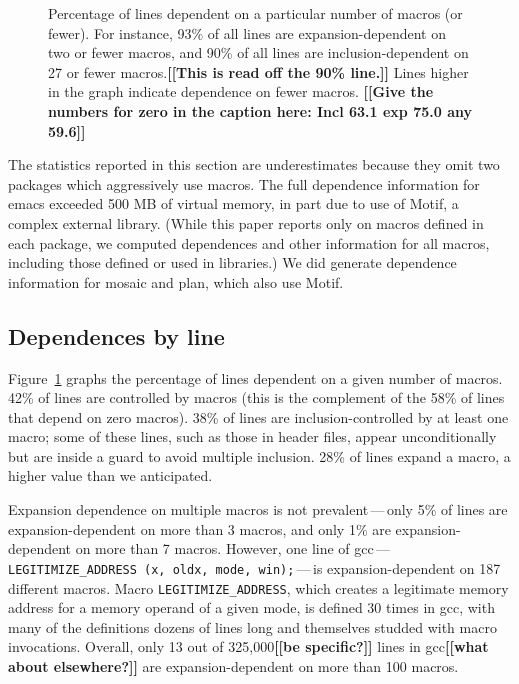 \documentclass[10pt]{article}
\newcommand{\comment}[1]{\textbf{[[#1]]}}
\newcommand{\pkg}[1]{\textsf{#1}}
\newcommand{\captionsmall}[1]{\caption[]{\small #1}}
\begin{document}
\begin{figure}
\centerline{}

\captionsmall{Percentage of lines dependent on a particular number of macros (or
  fewer).  For instance, 93\% of all lines are expansion-dependent on two
  or fewer macros, and 90\% of all lines are inclusion-dependent on 27 or
  fewer macros.\comment{This is read off the 90\% line.}  Lines higher in the graph indicate dependence on fewer macros.
  \comment{Give the numbers for zero in the caption here:
Incl 63.1
exp 75.0
any 59.6}}
\label{fig:dep-byline}
\end{figure}


The statistics reported in this section are underestimates because they
omit two packages which aggressively use macros.  The full dependence
information for \pkg{emacs} exceeded 500 MB of
virtual memory, in part due to use of Motif, a complex external library.
(While this paper reports only on macros defined in each package, we
computed dependences and other information for all macros, including those
defined or used in libraries.)  We did generate dependence information for
\pkg{mosaic} and \pkg{plan}, which also use Motif.


\subsection{Dependences by line}


Figure~\ref{fig:dep-byline} graphs the percentage of lines dependent on a
given number of macros.  42\% of lines are controlled by
macros (this is the complement of the 58\% of lines that depend on zero
macros).  38\% of lines are inclusion-controlled by at least
one macro; some of these lines, such as those in header files, appear
unconditionally but are inside a guard to avoid multiple inclusion.  28\%
of lines expand a macro, a higher value than we
anticipated.

Expansion dependence on multiple macros is not prevalent\,---\,only 5\% of
lines are expansion-dependent on more than 3 macros, and only 1\% are
expansion-dependent on more than 7 macros.  However, one line of
\pkg{gcc}\,---\,{\tt \verb|LEGITIMIZE_ADDRESS| (x, oldx, mode,
win);}\,---\,is expansion-dependent on 187 different macros.  Macro
\verb|LEGITIMIZE_ADDRESS|, which creates a legitimate memory address for a
memory operand of a given mode, is defined 30 times in \pkg{gcc}, with many of the
definitions dozens of lines long and themselves studded with macro
invocations.  Overall, only 13 out of 325,000\comment{be specific?} lines
in \pkg{gcc}\comment{what about elsewhere?} are
expansion-dependent on more than 100 macros.
\end{document}
